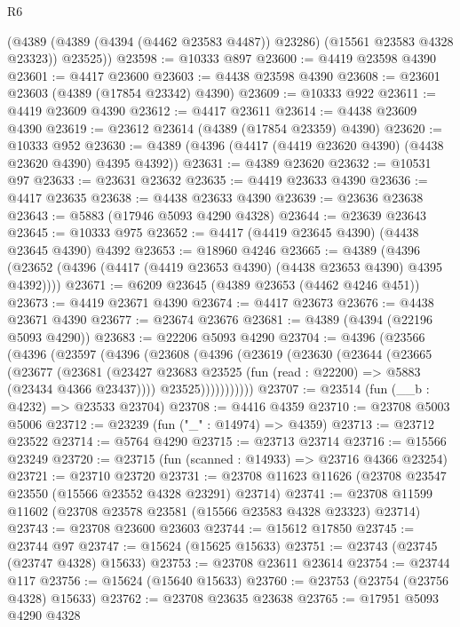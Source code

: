\begin{lexlean}{R6}
\begin{coremodule}
        (@4389 (@4389 (@4394 (@4462 @23583 @4487)) @23286) (@15561 @23583 @4328 @23323))
        @23525))
@23598 := @10333 @897
@23600 := @4419 @23598 @4390
@23601 := @4417 @23600
@23603 := @4438 @23598 @4390
@23608 := @23601 @23603 (@4389 (@17854 @23342) @4390)
@23609 := @10333 @922
@23611 := @4419 @23609 @4390
@23612 := @4417 @23611
@23614 := @4438 @23609 @4390
@23619 := @23612 @23614 (@4389 (@17854 @23359) @4390)
@23620 := @10333 @952
@23630 := @4389 (@4396 (@4417 (@4419 @23620 @4390) (@4438 @23620 @4390) @4395 @4392))
@23631 := @4389 @23620
@23632 := @10531 @97
@23633 := @23631 @23632
@23635 := @4419 @23633 @4390
@23636 := @4417 @23635
@23638 := @4438 @23633 @4390
@23639 := @23636 @23638
@23643 := @5883 (@17946 @5093 @4290 @4328)
@23644 := @23639 @23643
@23645 := @10333 @975
@23652 := @4417 (@4419 @23645 @4390) (@4438 @23645 @4390) @4392
@23653 := @18960 @4246
@23665 := @4389
    (@4396 (@23652 (@4396 (@4417 (@4419 @23653 @4390) (@4438 @23653 @4390) @4395 @4392))))
@23671 := @6209 @23645 (@4389 @23653 (@4462 @4246 @451))
@23673 := @4419 @23671 @4390
@23674 := @4417 @23673
@23676 := @4438 @23671 @4390
@23677 := @23674 @23676
@23681 := @4389 (@4394 (@22196 @5093 @4290))
@23683 := @22206 @5093 @4290
@23704 := @4396
    (@23566
      (@4396
        (@23597
          (@4396
            (@23608
              (@4396
                (@23619
                  (@23630
                    (@23644
                      (@23665
                        (@23677
                          (@23681
                            (@23427
                              @23683
                              @23525
                              (fun (read : @22200) => @5883 (@23434 @4366 @23437))))
                          @23525)))))))))))
@23707 := @23514 (fun (__b : @4232) => @23533 @23704)
@23708 := @4416 @4359
@23710 := @23708 @5003 @5006
@23712 := @23239 (fun ("_" : @14974) => @4359)
@23713 := @23712 @23522
@23714 := @5764 @4290
@23715 := @23713 @23714
@23716 := @15566 @23249
@23720 := @23715 (fun (scanned : @14933) => @23716 @4366 @23254)
@23721 := @23710 @23720
@23731 := @23708 @11623 @11626 (@23708 @23547 @23550 (@15566 @23552 @4328 @23291) @23714)
@23741 := @23708 @11599 @11602 (@23708 @23578 @23581 (@15566 @23583 @4328 @23323) @23714)
@23743 := @23708 @23600 @23603
@23744 := @15612 @17850
@23745 := @23744 @97
@23747 := @15624 (@15625 @15633)
@23751 := @23743 (@23745 (@23747 @4328) @15633)
@23753 := @23708 @23611 @23614
@23754 := @23744 @117
@23756 := @15624 (@15640 @15633)
@23760 := @23753 (@23754 (@23756 @4328) @15633)
@23762 := @23708 @23635 @23638
@23765 := @17951 @5093 @4290 @4328

\end{coremodule}
\end{lexlean}
